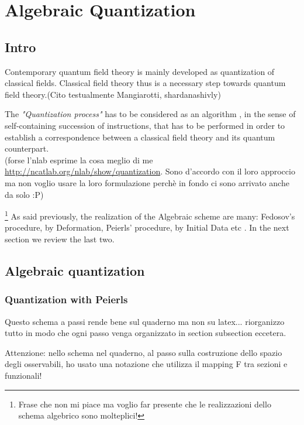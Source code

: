 \documentclass[Main]{subfiles}
\begin{document}
\chapter{Algebraic Quantization}
\section{Intro}
	Contemporary quantum field theory is mainly developed as quantization of classical fields. Classical field theory thus is a necessary step towards quantum field theory.\danger (Cito testualmente Mangiarotti, shardanashivly)
	
The \emph{"Quantization process"} has to be considered as an algorithm , in the sense of self-containing succession of instructions, that has to be performed in order to establish a correspondence between a classical field theory and its quantum counterpart.\\
\danger (forse l'nlab esprime la cosa meglio di me \url{http://ncatlab.org/nlab/show/quantization}. Sono d'accordo con il loro approccio ma non voglio usare la loro formulazione perchè in fondo ci sono arrivato anche da solo :P)


\danger\footnote{Frase che non mi piace ma voglio far presente che le realizzazioni dello schema algebrico sono molteplici!}
As said previously, the realization of the Algebraic scheme are many: Fedosov's procedure, by Deformation, Peierls' procedure, by Initial Data etc .
In the next section we review the last two.

\section{Algebraic quantization}
\subsection{Quantization with Peierls}
\danger Questo schema a passi rende bene sul quaderno ma non su latex... riorganizzo tutto in modo che ogni passo venga organizzato in section subsection eccetera.

\danger Attenzione: nello schema nel quaderno, al passo sulla costruzione dello spazio degli osservabili, ho usato una notazione che utilizza il mapping F tra sezioni e funzionali!
\end{document}
